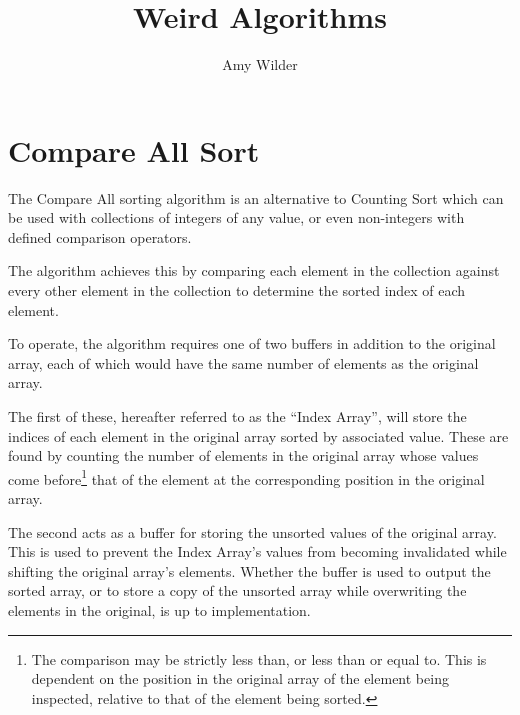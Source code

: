 \documentclass{article}
\title{Weird Algorithms}
\author{Amy Wilder}
\begin{document}
\maketitle

\section{Compare All Sort}

The Compare All sorting algorithm is an alternative to Counting Sort which can be used with collections of integers of any value, or even non-integers with defined comparison operators.

The algorithm achieves this by comparing each element in the collection against every other element in the collection to determine the sorted index of each element.

To operate, the algorithm requires one of two buffers in addition to the original array, each of which would have the same number of elements as the original array.

The first of these, hereafter referred to as the ``Index Array'', will store the indices of each element in the original array sorted by associated value.
These are found by counting the number of elements in the original array whose values come before\footnote{
    The comparison may be strictly less than, or less than or equal to.
    This is dependent on the position in the original array of the element being inspected, relative to that of the element being sorted.
} that of the element at the corresponding position in the original array.

The second acts as a buffer for storing the unsorted values of the original array.
This is used to prevent the Index Array's values from becoming invalidated while shifting the original array's elements.
Whether the buffer is used to output the sorted array, or to store a copy of the unsorted array while overwriting the elements in the original, is up to implementation.
\end{document}
